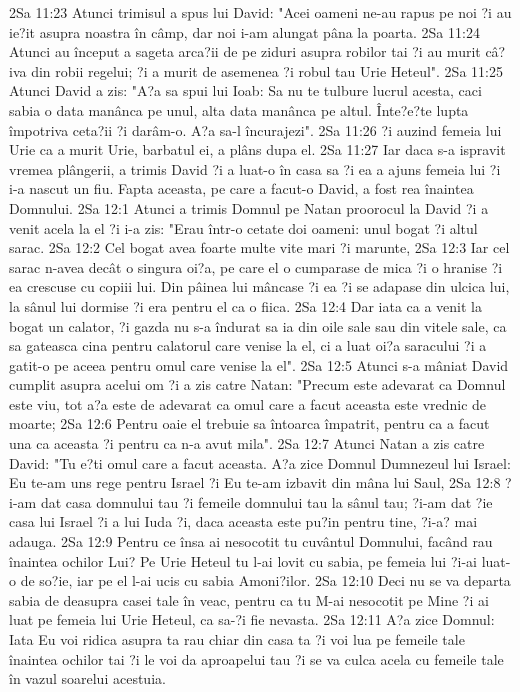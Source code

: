 2Sa 11:23  Atunci trimisul a spus lui David: "Acei oameni ne-au rapus pe noi ?i au ie?it asupra noastra în câmp, dar noi i-am alungat pâna la poarta.
2Sa 11:24  Atunci au început a sageta arca?ii de pe ziduri asupra robilor tai ?i au murit câ?iva din robii regelui; ?i a murit de asemenea ?i robul tau Urie Heteul".
2Sa 11:25  Atunci David a zis: "A?a sa spui lui Ioab: Sa nu te tulbure lucrul acesta, caci sabia o data manânca pe unul, alta data manânca pe altul. Înte?e?te lupta împotriva ceta?ii ?i darâm-o. A?a sa-l încurajezi".
2Sa 11:26  ?i auzind femeia lui Urie ca a murit Urie, barbatul ei, a plâns dupa el.
2Sa 11:27  Iar daca s-a ispravit vremea plângerii, a trimis David ?i a luat-o în casa sa ?i ea a ajuns femeia lui ?i i-a nascut un fiu. Fapta aceasta, pe care a facut-o David, a fost rea înaintea Domnului.
2Sa 12:1  Atunci a trimis Domnul pe Natan proorocul la David ?i a venit acela la el ?i i-a zis: "Erau într-o cetate doi oameni: unul bogat ?i altul sarac.
2Sa 12:2  Cel bogat avea foarte multe vite mari ?i marunte,
2Sa 12:3  Iar cel sarac n-avea decât o singura oi?a, pe care el o cumparase de mica ?i o hranise ?i ea crescuse cu copiii lui. Din pâinea lui mâncase ?i ea ?i se adapase din ulcica lui, la sânul lui dormise ?i era pentru el ca o fiica.
2Sa 12:4  Dar iata ca a venit la bogat un calator, ?i gazda nu s-a îndurat sa ia din oile sale sau din vitele sale, ca sa gateasca cina pentru calatorul care venise la el, ci a luat oi?a saracului ?i a gatit-o pe aceea pentru omul care venise la el".
2Sa 12:5  Atunci s-a mâniat David cumplit asupra acelui om ?i a zis catre Natan: "Precum este adevarat ca Domnul este viu, tot a?a este de adevarat ca omul care a facut aceasta este vrednic de moarte;
2Sa 12:6  Pentru oaie el trebuie sa întoarca împatrit, pentru ca a facut una ca aceasta ?i pentru ca n-a avut mila".
2Sa 12:7  Atunci Natan a zis catre David: "Tu e?ti omul care a facut aceasta. A?a zice Domnul Dumnezeul lui Israel: Eu te-am uns rege pentru Israel ?i Eu te-am izbavit din mâna lui Saul,
2Sa 12:8  ?i-am dat casa domnului tau ?i femeile domnului tau la sânul tau; ?i-am dat ?ie casa lui Israel ?i a lui Iuda ?i, daca aceasta este pu?in pentru tine, ?i-a? mai adauga.
2Sa 12:9  Pentru ce însa ai nesocotit tu cuvântul Domnului, facând rau înaintea ochilor Lui? Pe Urie Heteul tu l-ai lovit cu sabia, pe femeia lui ?i-ai luat-o de so?ie, iar pe el l-ai ucis cu sabia Amoni?ilor.
2Sa 12:10  Deci nu se va departa sabia de deasupra casei tale în veac, pentru ca tu M-ai nesocotit pe Mine ?i ai luat pe femeia lui Urie Heteul, ca sa-?i fie nevasta.
2Sa 12:11  A?a zice Domnul: Iata Eu voi ridica asupra ta rau chiar din casa ta ?i voi lua pe femeile tale înaintea ochilor tai ?i le voi da aproapelui tau ?i se va culca acela cu femeile tale în vazul soarelui acestuia.
